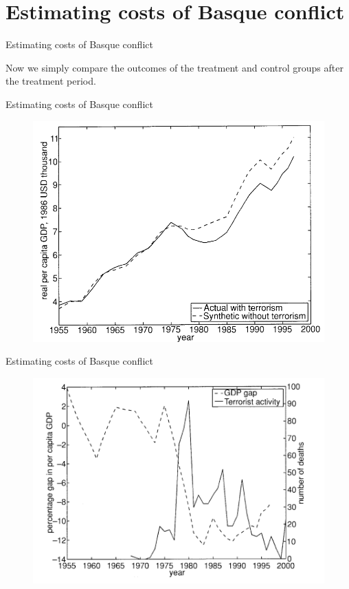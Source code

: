 \documentclass[notes,11pt, aspectratio=169]{beamer}
\newenvironment{wideitemize}{\itemize\addtolength{\itemsep}{10pt}}{\enditemize}
\begin{document}
\section{Estimating costs of Basque conflict}    

\begin{frame}{Estimating costs of Basque conflict}
    \begin{wideitemize}
        \item Now we simply compare the outcomes of the treatment and control groups after the treatment period. 
    \end{wideitemize}
\end{frame}

\begin{frame}{Estimating costs of Basque conflict}
    \begin{figure}
        \centering
        \includegraphics[width = .7\textwidth]{figures/ts.png}
        \label{fig:my_label}
    \end{figure}
\end{frame}

\begin{frame}{Estimating costs of Basque conflict}
    \begin{figure}
        \centering
        \includegraphics[width = .7\textwidth]{figures/ts1.png}
        \label{fig:my_label}
    \end{figure}
\end{frame}
\end{document}
